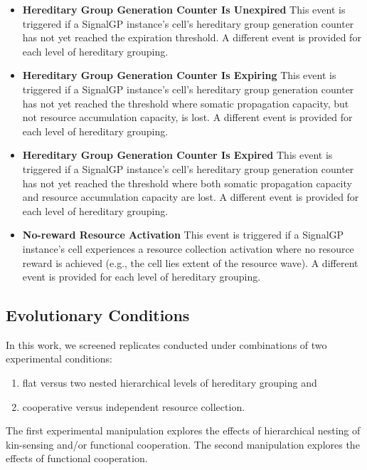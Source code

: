 \begin{itemize}
\item \textbf{Hereditary Group Generation Counter Is Unexpired}
This event is triggered if a SignalGP instance's cell's hereditary group generation counter has not yet reached the expiration threshold.
A different event is provided for each level of hereditary grouping.
\item \textbf{Hereditary Group Generation Counter Is Expiring}
This event is triggered if a SignalGP instance's cell's hereditary group generation counter has not yet reached the threshold where somatic propagation capacity, but not resource accumulation capacity, is lost.
A different event is provided for each level of hereditary grouping.
\item \textbf{Hereditary Group Generation Counter Is Expired}
This event is triggered if a SignalGP instance's cell's hereditary group generation counter has not yet reached the threshold where both somatic propagation capacity and resource accumulation capacity are lost.
A different event is provided for each level of hereditary grouping.
\item \textbf{No-reward Resource Activation}
This event is triggered if a SignalGP instance's cell experiences a resource collection activation where no resource reward is achieved (e.g., the cell lies extent of the resource wave).
A different event is provided for each level of hereditary grouping.
\end{itemize}

\subsection{Evolutionary Conditions} \label{sup:treatments}





In this work, we screened replicates conducted under combinations of two experimental conditions:
\begin{enumerate}
\item flat versus two nested hierarchical levels of hereditary grouping and
\item cooperative versus independent resource collection.
\end{enumerate}

The first experimental manipulation explores the effects of hierarchical nesting of kin-sensing and/or functional cooperation.
The second manipulation explores the effects of functional cooperation.


